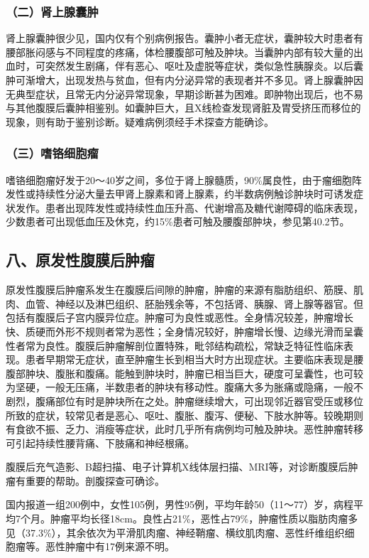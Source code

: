 \subsubsection{（二）肾上腺囊肿}

肾上腺囊肿很少见，国内仅有个别病例报告。囊肿小者无症状，囊肿较大时患者有腰部胀闷感与不同程度的疼痛，体检腰腹部可触及肿块。当囊肿内部有较大量的出血时，可突然发生剧痛，伴有恶心、呕吐及虚脱等症状，类似急性胰腺炎。以后囊肿可渐增大，出现发热与贫血，但有内分泌异常的表现者并不多见。肾上腺囊肿因无典型症状，且常无内分泌异常现象，早期诊断甚为困难。即肿物出现后，也不易与其他腹膜后囊肿相鉴别。如囊肿巨大，且X线检查发现肾脏及胃受挤压而移位的现象，则有助于鉴别诊断。疑难病例须经手术探查方能确诊。

\subsubsection{（三）嗜铬细胞瘤}

嗜铬细胞瘤好发于20～40岁之间，多位于肾上腺髓质，90\%属良性，由于瘤细胞阵发性或持续性分泌大量去甲肾上腺素和肾上腺素，约半数病例触诊肿块时可诱发症状发作。患者出现阵发性或持续性血压升高、代谢增高及糖代谢障碍的临床表现，少数患者可出现低血压及休克，约15\%患者可触及腰腹部肿块，参见第40.2节。

\subsection{八、原发性腹膜后肿瘤}

原发性腹膜后肿瘤系发生在腹膜后间隙的肿瘤，肿瘤的来源有脂肪组织、筋膜、肌肉、血管、神经以及淋巴组织、胚胎残余等，不包括肾、胰腺、肾上腺等器官。但包括有腹膜后子宫内膜异位症。肿瘤可为良性或恶性。全身情况较差，肿瘤增长快、质硬而外形不规则者常为恶性；全身情况较好，肿瘤增长慢、边缘光滑而呈囊性者常为良性。腹膜后肿瘤解剖位置特殊，毗邻结构疏松，常缺乏特征性临床表现。患者早期常无症状，直至肿瘤生长到相当大时方出现症状。主要临床表现是腰腹部肿块、腹胀和腹痛。能触到肿块时，肿瘤已相当巨大，硬度可呈囊性，也可较为坚硬，一般无压痛，半数患者的肿块有移动性。腹痛大多为胀痛或隐痛，一般不剧烈，腹痛部位有时是肿块所在之处。肿瘤继续增大，可出现邻近器官受压或移位所致的症状，较常见者是恶心、呕吐、腹胀、腹泻、便秘、下肢水肿等。较晚期则有食欲不振、乏力、消瘦等症状，此时几乎所有病例均可触及肿块。恶性肿瘤转移可引起持续性腰背痛、下肢痛和神经根痛。

腹膜后充气造影、B超扫描、电子计算机X线体层扫描、MRI等，对诊断腹膜后肿瘤有重要的帮助。剖腹探查可确诊。

国内报道一组200例中，女性105例，男性95例，平均年龄50（11～77）岁，病程平均7个月。肿瘤平均长径18cm。良性占21\%，恶性占79\%，肿瘤性质以脂肪肉瘤多见（37.3\%），其余依次为平滑肌肉瘤、神经鞘瘤、横纹肌肉瘤、恶性纤维组织细胞瘤等。恶性肿瘤中有17例来源不明。

